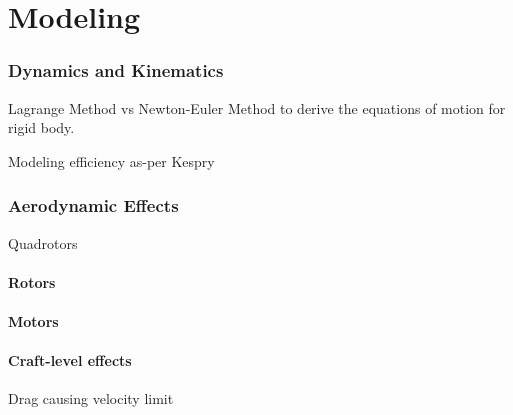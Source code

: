 \chapter{Modeling}

\subsection{Dynamics and Kinematics}

Lagrange Method vs Newton-Euler Method to derive the equations of motion for rigid body.

Modeling efficiency as-per Kespry

\subsection{Aerodynamic Effects}

Quadrotors 

\subsubsection{Rotors}

\subsubsection{Motors}

\subsubsection{Craft-level effects}

Drag causing velocity limit